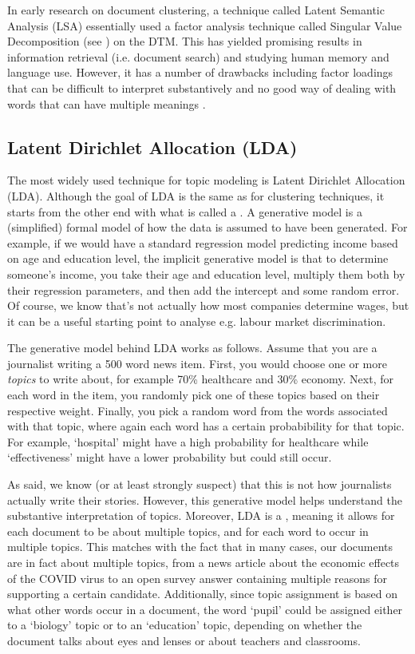 In early research on document clustering, a technique called Latent Semantic Analysis (LSA) essentially used a factor analysis technique called Singular Value Decomposition (see ) on the DTM.
This has yielded promising results in information retrieval (i.e. document search) and studying human memory and language use.
However, it has a number of drawbacks including factor loadings that can be difficult to interpret substantively and no good way of dealing with words that can have multiple meanings \citep{lsa}.

\subsection{Latent Dirichlet Allocation (LDA)}

The most widely used technique for topic modeling is Latent Dirichlet Allocation (LDA).
Although the goal of LDA is the same as for clustering techniques, it starts from the other end with what is called a .
A generative model is a (simplified) formal model of how the data is assumed to have been generated.
For example, if we would have a standard regression model predicting income based on age and education level,
the implicit generative model is that to determine someone's income, you take their age and education level,
multiply them both by their regression parameters, and then add the intercept and some random error.
Of course, we know that's not actually how most companies determine wages, but it can be a useful starting point to analyse e.g. labour market discrimination.

The generative model behind LDA works as follows.
Assume that you are a journalist writing a 500 word news item.
First, you would choose one or more \emph{topics} to write about,
for example 70\% healthcare and 30\% economy.
Next, for each word in the item, you randomly pick one of these topics based on their respective weight.
Finally, you pick a random word from the words associated with that topic,
where again each word has a certain probabibility for that topic.
For example, `hospital' might have a high probability for healthcare while `effectiveness' might have a lower probability but could still occur.

As said, we know (or at least strongly suspect) that this is not how journalists actually write their stories.
However, this generative model helps understand the substantive interpretation of topics.
Moreover, LDA is a , meaning it allows for each document to be about multiple topics, and for each word to occur in multiple topics.
This matches with the fact that in many cases, our documents are in fact about multiple topics,
from a news article about the economic effects of the COVID virus to an open survey answer containing multiple reasons for supporting a certain candidate. 
Additionally, since topic assignment is based on what other words occur in a document,
the word `pupil' could be assigned either to a `biology' topic or to an `education' topic, depending
on whether the document talks about eyes and lenses or about teachers and classrooms.

